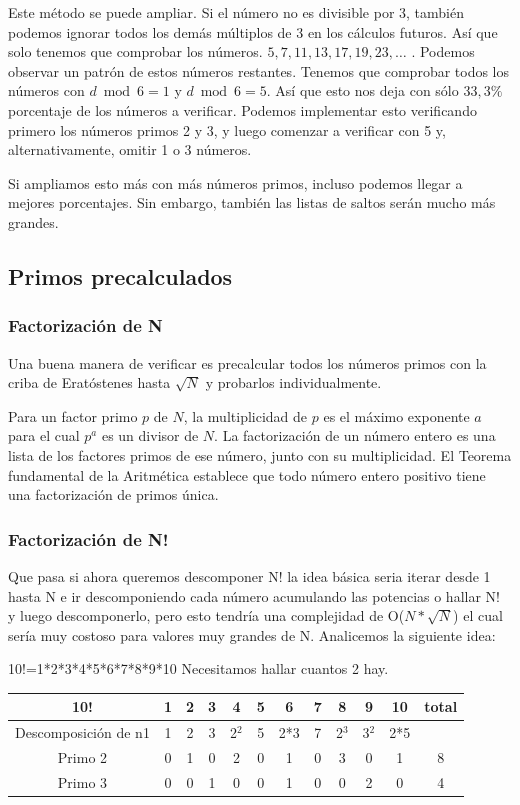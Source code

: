 Este método se puede ampliar. Si el número no es divisible por 3, también podemos ignorar todos los 
demás múltiplos de 3 en los cálculos futuros. Así que solo tenemos que comprobar los números. $5, 7, 
11, 13, 17, 19, 23, \dots$ . Podemos observar un patrón de estos números restantes. Tenemos que 
comprobar todos los números con $d \bmod 6 = 1$ y $d\bmod 6 = 5$. Así que esto nos deja con sólo $33,3\%$ porcentaje de los números a verificar. Podemos implementar esto verificando primero los 
números primos 2 y 3, y luego comenzar a verificar con 5 y, alternativamente, omitir 1 o 3 números.

Si ampliamos esto más con más números primos, incluso podemos llegar a mejores porcentajes. Sin embargo, también las listas de saltos serán mucho más grandes.

\subsection{Primos precalculados}


\subsubsection{Factorización de N}

Una buena manera de verificar es precalcular todos los números primos con la criba de Eratóstenes hasta $\sqrt{N}$ y probarlos individualmente.

Para un factor primo $p$ de $N$, la multiplicidad de $p$ es el máximo exponente $a$ para el cual $p^a$ es un divisor de $N$. La factorización de un número entero es una lista de los factores primos de ese número, junto con su multiplicidad. El Teorema fundamental de la Aritmética establece que todo número entero positivo tiene una factorización de primos única.

\subsubsection{Factorización de N!}

Que pasa si ahora queremos descomponer N! la idea básica seria iterar desde 1 hasta N e ir descomponiendo cada número acumulando las potencias o hallar N! y luego descomponerlo, pero esto tendría una complejidad de O($N* \sqrt{N}$) el cual sería muy costoso para valores muy grandes de N. Analicemos la siguiente idea:

10!=1*2*3*4*5*6*7*8*9*10 Necesitamos hallar cuantos 2 hay.

\begin{tabular}{|c|c|c|c|c|c|c|c|c|c|c|c|}
	\hline 
	10!& 1 & 2 & 3 & 4 & 5 & 6 & 7 & 8 & 9 & 10 & total \\ 
	\hline 
	Descomposición de n1& 1 & 2 & 3 & 2$^{2}$ & 5 & 2*3 & 7 & 2$^{3}$ & 3$^{2}$ & 2*5 &  \\ 
	\hline 
	Primo 2& 0 & 1 & 0 & 2 & 0 & 1 & 0 & 3 & 0 & 1 & 8 \\ 
	\hline 
	Primo 3& 0 & 0 & 1 & 0 & 0 & 1 & 0 & 0 & 2 & 0 & 4 \\ 
	\hline 
\end{tabular} 

